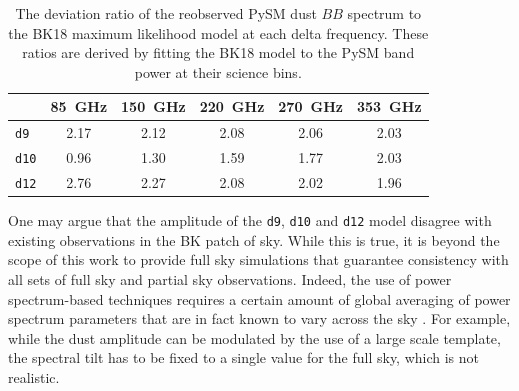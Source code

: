\documentclass[twocolumn]{aastex631}
\newcommand{\dnine}{{\tt d9}}
\begin{document}
\begin{table}[]
    \centering
    \begin{tabular}{lccccc}
    \toprule 
     & 85~GHz & 150~GHz & 220~GHz & 270~GHz & 353~GHz \\
    \midrule
    \texttt{d9}  & 2.17 & 2.12 & 2.08 & 2.06 & 2.03 \\
    \texttt{d10} & 0.96 & 1.30 & 1.59 & 1.77 & 2.03 \\
    \texttt{d12} & 2.76	& 2.27 & 2.08 & 2.02 & 1.96 \\
   \bottomrule
    \end{tabular}
    \caption{The deviation ratio of the reobserved PySM dust $BB$ spectrum to the BK18 maximum likelihood model at each delta frequency. These ratios are derived by fitting the BK18 model to the PySM band power at their science bins.}
    \label{tab:BB_dustratio}
\end{table}

One may argue that the amplitude of the \texttt{d9}, \texttt{d10} and \texttt{d12} model disagree with existing observations in the BK patch of sky. While this is true, it is beyond the scope of this work to provide full sky simulations that guarantee consistency with all sets of full sky and partial sky observations. Indeed, the use of power spectrum-based techniques requires a certain amount of global averaging of power spectrum parameters that are in fact known to vary across the sky \cite{planck2016-l04}. For example, while the dust amplitude can be modulated by the use of a large scale template, the spectral tilt has to be fixed to a single value for the full sky, which is not realistic. 


\end{document}
